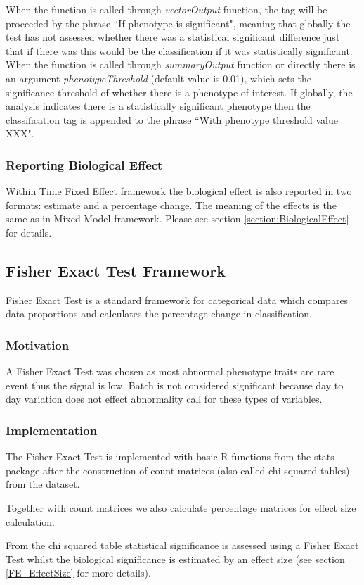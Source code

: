 \documentclass[12pt,a4paper]{article}
\begin{document}
When the function is called through \textit{vectorOutput} function, the tag will be proceeded by the phrase “If phenotype is significant", meaning that globally the test has not assessed whether there was a statistical significant difference just that if there was this would be the classification if it was statistically significant. When the function is called through \textit{summaryOutput} function or directly there is an argument \textit{phenotypeThreshold} (default value is 0.01), which sets the significance threshold of whether there is a phenotype of interest. If globally, the analysis indicates there is a statistically significant phenotype then the classification tag is appended to the phrase “With phenotype threshold value XXX".

\subsubsection{Reporting Biological Effect}
Within Time Fixed Effect framework the biological effect is also reported in two formats: estimate and a percentage change. The meaning of the effects is the same as in Mixed Model framework. Please see section \ref{section:BiologicalEffect} for details. 
\subsection{Fisher Exact Test Framework}
\label{section:FET}
Fisher Exact Test is a standard framework for categorical data which compares data proportions and calculates the percentage change in classification. 
\subsubsection{Motivation}
A Fisher Exact Test was chosen as most abnormal phenotype traits are rare event thus the signal is low. Batch is not considered significant because day to day variation does not effect abnormality call for these types of variables.
\subsubsection{Implementation}
The Fisher Exact Test is implemented with basic R functions from the stats package after the construction of count matrices (also called chi squared tables) from the dataset. 

Together with count matrices we also calculate percentage matrices for effect size calculation.

From the chi squared table statistical significance is assessed using a Fisher Exact Test whilst the biological significance is estimated by an effect size (see section \ref{FE_EffectSize} for more details).
\end{document}
